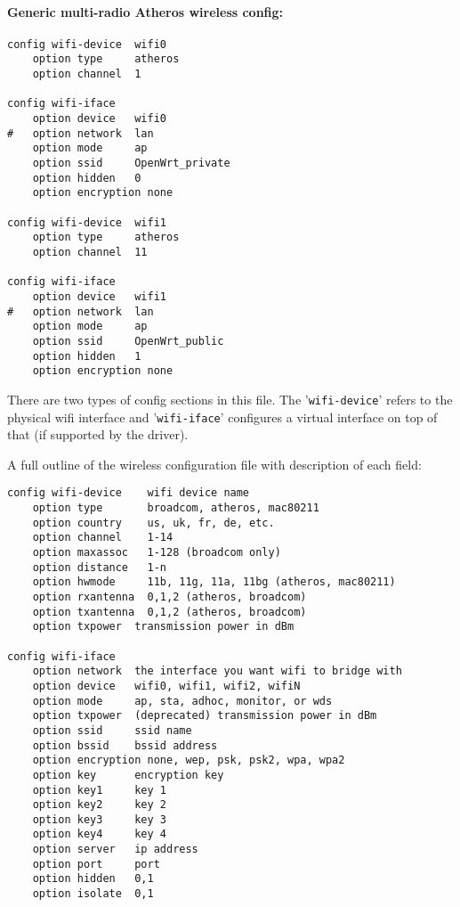 \paragraph{Generic multi-radio Atheros wireless config:}

\begin{Verbatim}
config wifi-device  wifi0
    option type     atheros
    option channel  1

config wifi-iface
    option device   wifi0
#   option network  lan
    option mode     ap
    option ssid     OpenWrt_private
    option hidden   0
    option encryption none

config wifi-device  wifi1
    option type     atheros
    option channel  11

config wifi-iface
    option device   wifi1
#   option network  lan
    option mode     ap
    option ssid     OpenWrt_public
    option hidden   1
    option encryption none
\end{Verbatim}

There are two types of config sections in this file. The '\texttt{wifi-device}' refers to
the physical wifi interface and '\texttt{wifi-iface}' configures a virtual interface on top
of that (if supported by the driver).

A full outline of the wireless configuration file with description of each field:

\begin{Verbatim}
config wifi-device    wifi device name
    option type       broadcom, atheros, mac80211
    option country    us, uk, fr, de, etc.
    option channel    1-14
    option maxassoc   1-128 (broadcom only)
    option distance   1-n
    option hwmode     11b, 11g, 11a, 11bg (atheros, mac80211)
    option rxantenna  0,1,2 (atheros, broadcom)
    option txantenna  0,1,2 (atheros, broadcom)
    option txpower  transmission power in dBm

config wifi-iface
    option network  the interface you want wifi to bridge with
    option device   wifi0, wifi1, wifi2, wifiN
    option mode     ap, sta, adhoc, monitor, or wds
    option txpower  (deprecated) transmission power in dBm
    option ssid     ssid name
    option bssid    bssid address
    option encryption none, wep, psk, psk2, wpa, wpa2
    option key      encryption key
    option key1     key 1
    option key2     key 2
    option key3     key 3
    option key4     key 4
    option server   ip address
    option port     port
    option hidden   0,1
    option isolate  0,1
\end{Verbatim}

